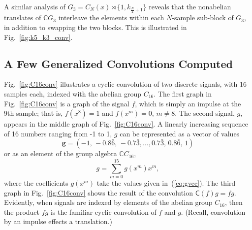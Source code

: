 \documentclass[reqno,onecolumn,oneside]{paper}
\newcommand{\<}{\ensuremath{\langle}}
\renewcommand{\>}{\ensuremath{\rangle}}
\newcommand{\sdp}{\ensuremath{\rtimes}}
\newcommand{\field}[1]{\ensuremath{\mathbb{#1}}}
\newcommand{\C}{\field{C}}                   %
\newcommand{\lt}[1]{\ensuremath{\mathsf{#1}}}
\newcommand{\ga}[1]{\ensuremath{\C #1}} %
\newcommand{\CG}{\ga{G}}                %
\begin{document}
\begin{example}
A similar analysis of $G_3 = C_N(x) \sdp \{1,
k_{\frac{N}{2} + 1}\}$ reveals
that the nonabelian translates of $\CG_3$ interleave the 
elements within each $N$-sample sub-block of $G_3$, 
in addition to swapping the two blocks.
This is illustrated in Fig.~\ref{fig:k5_k3_conv}.
\end{example}

\subsection{A Few Generalized Convolutions Computed}

Fig.~\ref{fig:C16conv} illustrates a cyclic
convolution of two discrete signals, with 16 samples each, 
indexed with the abelian group $C_{16}$. 
The first graph in Fig.~\ref{fig:C16conv} is a graph of the
signal $f$, which is simply an impulse at the 9th sample; that is,
$f(x^8) = 1$ and 
$f(x^m) = 0, \, m\neq 8$.
The second signal, $g$, appears in the middle graph of
Fig.~\ref{fig:C16conv}.  A linearly increasing sequence
of 16 numbers ranging from -1 to 1, $g$ can be represented
as a vector of values
\begin{equation}
  \label{eq:gvec}
\mathbf{g} = 
(-1, \, -0.8\bar{6}, \, -0.7\bar{3}, \ldots,
0.7\bar{3}, \, 0.8\bar{6}, \, 1)
\end{equation}
or as an element of the group algebra $\C C_{16}$,
\[
g = \sum_{m=0}^{15} g(x^m) x^m,
\]
where the coefficients $g(x^m)$ take the values given
in~(\ref{eq:gvec}).  The third graph in
Fig.~\ref{fig:C16conv} shows the result of the convolution
$\lt{C}(f)g = fg$.    Evidently, when signals are indexed by
elements of the abelian group $C_{16}$, then the product $fg$
is the familiar cyclic convolution of $f$ and $g$. (Recall,
convolution by an impulse effects a translation.)
\end{document}
